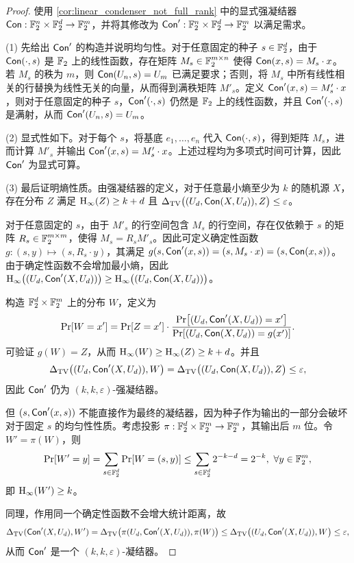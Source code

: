 \begin{proof}
    使用 \cref{cor:linear_condenser_not_full_rank} 中的显式强凝结器 $\mathsf{Con} : \mathbb{F}_2^n \times \mathbb{F}_2^d \to \mathbb{F}_2^m$，并将其修改为 $\mathsf{Con}' : \mathbb{F}_2^n \times \mathbb{F}_2^d \to \mathbb{F}_2^m$ 以满足需求。

    (1) 先给出 $\mathsf{Con}'$ 的构造并说明均匀性。对于任意固定的种子 $s \in \mathbb{F}_2^d$，由于 $\mathsf{Con}(\cdot ,s)$ 是 $\mathbb{F}_2$ 上的线性函数，存在矩阵 $M_s \in \mathbb{F}_2^{m \times n}$ 使得 $\mathsf{Con}(x,s) = M_s \cdot x$。若 $M_s$ 的秩为 $m$，则 $\mathsf{Con}(U_n, s) = U_m$ 已满足要求；否则，将 $M_s$ 中所有线性相关的行替换为线性无关的向量，从而得到满秩矩阵 $M'_s$。定义 $\mathsf{Con}'(x, s) = M'_s \cdot x$，则对于任意固定的种子 $s$，$\mathsf{Con}'(\cdot ,s)$ 仍然是 $\mathbb{F}_2$ 上的线性函数，并且 $\mathsf{Con}'(\cdot, s)$ 是满射，从而 $\mathsf{Con}'(U_n, s) = U_m$。

    (2) 显式性如下。对于每个 $s$，将基底 $e_1, \ldots, e_n$ 代入 $\mathsf{Con}(\cdot, s)$，得到矩阵 $M_s$，进而计算 $M'_s$ 并输出 $\mathsf{Con}'(x, s) = M'_s \cdot x$。上述过程均为多项式时间可计算，因此 $\mathsf{Con}'$ 为显式可算。

    (3) 最后证明熵性质。由强凝结器的定义，对于任意最小熵至少为 $k$ 的随机源 $X$，存在分布 $Z$ 满足 $\mathrm{H}_\infty(Z) \ge k + d$ 且 $\Delta_{\mathrm{TV}}\big((U_d, \mathsf{Con}(X, U_d)), Z\big) \le \varepsilon$。

    对于任意固定的 $s$，由于 $M'_s$ 的行空间包含 $M_s$ 的行空间，存在仅依赖于 $s$ 的矩阵 $R_s \in \mathbb{F}_2^{m \times m}$，使得 $M_s = R_s M'_s$。因此可定义确定性函数 $g : (s, y) \mapsto (s, R_s \cdot y)$，其满足
    $g(s, \mathsf{Con}'(x, s)) = (s, M_s \cdot x) = (s, \mathsf{Con}(x, s))$。
    由于确定性函数不会增加最小熵，因此
    $\mathrm{H}_\infty\big((U_d, \mathsf{Con}'(X, U_d))\big) \ge \mathrm{H}_\infty\big((U_d, \mathsf{Con}(X, U_d))\big)$。

    构造 $\mathbb{F}_2^d \times \mathbb{F}_2^m$ 上的分布 $W$，定义为
    $$
    \Pr[W = x'] = \Pr[Z = x'] \cdot \frac{\Pr[(U_d, \mathsf{Con}'(X, U_d)) = x']}{\Pr[(U_d, \mathsf{Con}(X, U_d)) = g(x')]}.
    $$
    可验证 $g(W) = Z$，从而 $\mathrm{H}_\infty(W) \ge \mathrm{H}_\infty(Z) \ge k + d$。并且
    $$
    \Delta_{\mathrm{TV}}\big((U_d, \mathsf{Con}'(X, U_d)), W\big) = \Delta_{\mathrm{TV}}\big((U_d, \mathsf{Con}(X, U_d)), Z\big) \le \varepsilon,
    $$
    因此 $\mathsf{Con}'$ 仍为 $(k, k, \varepsilon)$-强凝结器。

    但 $(s, \mathsf{Con}'(x, s))$ 不能直接作为最终的凝结器，因为种子作为输出的一部分会破坏对于固定 $s$ 的均匀性性质。考虑投影 $\pi : \mathbb{F}_2^d \times \mathbb{F}_2^m \to \mathbb{F}_2^m$，其输出后 $m$ 位。令 $W' = \pi(W)$，则
    $$
    \Pr[W' = y] = \sum_{s \in \mathbb{F}_2^d} \Pr[W = (s, y)] \le \sum_{s \in \mathbb{F}_2^d} 2^{-k - d} = 2^{-k},\ \forall y \in \mathbb{F}_2^m,
    $$
    即 $\mathrm{H}_\infty(W') \ge k$。

    同理，作用同一个确定性函数不会增大统计距离，故
    $$
    \Delta_{\mathrm{TV}}(\mathsf{Con}'(X, U_d), W') = \Delta_{\mathrm{TV}}\big( \pi(U_d, \mathsf{Con}'(X, U_d)), \pi(W) \big) \le \Delta_{\mathrm{TV}}\big((U_d, \mathsf{Con}'(X, U_d)), W\big) \le \varepsilon,
    $$
    从而 $\mathsf{Con}'$ 是一个 $(k, k, \varepsilon)$-凝结器。
\end{proof}

